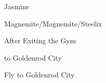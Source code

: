 \begin{paracol}{2}
\begin{boss}{Jasmine}
	\varwb
	\begin{fightSection}{Magnemite/Magnemite/Steelix}
		\item {} \surf{} 
	\end{fightSection}
	\varwe
\end{boss}

\begin{menu}{After Exiting the Gym}
	\varwb
	\begin{pokeMenu}
		\item {} \fly{} to Goldenrod City \menuHlTwo{(4\pointUp)}
	\end{pokeMenu}
	\varwe
\end{menu}

\switchcolumn
\begin{story}{Fly to Goldenrod City}
	\varwb
	\varwe
\end{story}

\end{paracol}
\vspace{3.5mm}